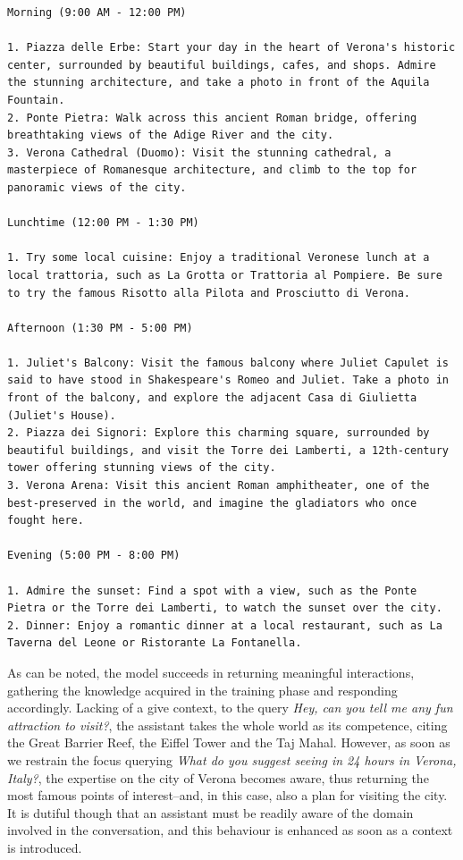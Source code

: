\begin{Verbatim}[breaklines=true]
Morning (9:00 AM - 12:00 PM)

1. Piazza delle Erbe: Start your day in the heart of Verona's historic center, surrounded by beautiful buildings, cafes, and shops. Admire the stunning architecture, and take a photo in front of the Aquila Fountain.
2. Ponte Pietra: Walk across this ancient Roman bridge, offering breathtaking views of the Adige River and the city.
3. Verona Cathedral (Duomo): Visit the stunning cathedral, a masterpiece of Romanesque architecture, and climb to the top for panoramic views of the city.

Lunchtime (12:00 PM - 1:30 PM)

1. Try some local cuisine: Enjoy a traditional Veronese lunch at a local trattoria, such as La Grotta or Trattoria al Pompiere. Be sure to try the famous Risotto alla Pilota and Prosciutto di Verona.

Afternoon (1:30 PM - 5:00 PM)

1. Juliet's Balcony: Visit the famous balcony where Juliet Capulet is said to have stood in Shakespeare's Romeo and Juliet. Take a photo in front of the balcony, and explore the adjacent Casa di Giulietta (Juliet's House).
2. Piazza dei Signori: Explore this charming square, surrounded by beautiful buildings, and visit the Torre dei Lamberti, a 12th-century tower offering stunning views of the city.
3. Verona Arena: Visit this ancient Roman amphitheater, one of the best-preserved in the world, and imagine the gladiators who once fought here.

Evening (5:00 PM - 8:00 PM)

1. Admire the sunset: Find a spot with a view, such as the Ponte Pietra or the Torre dei Lamberti, to watch the sunset over the city.
2. Dinner: Enjoy a romantic dinner at a local restaurant, such as La Taverna del Leone or Ristorante La Fontanella.
\end{Verbatim}

As can be noted, the model succeeds in returning meaningful interactions, gathering the knowledge acquired in the training phase and responding accordingly. Lacking of a give context, to the query \textit{Hey, can you tell me any fun attraction to visit?}, the assistant takes the whole world as its competence, citing the Great Barrier Reef, the Eiffel Tower and the Taj Mahal. However, as soon as we restrain the focus querying \textit{What do you suggest seeing in 24 hours in Verona, Italy?}, the expertise on the city of Verona becomes aware, thus returning the most famous points of interest--and, in this case, also a plan for visiting the city. It is dutiful though that an assistant must be readily aware of the domain involved in the conversation, and this behaviour is enhanced as soon as a context is introduced.


